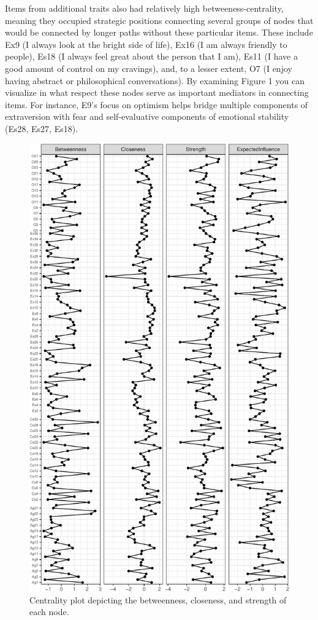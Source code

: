 \documentclass[man]{apa6}
\begin{document}
Items from additional traits also had relatively high
betweeness-centrality, meaning they occupied strategic positions
connecting several groups of nodes that would be connected by longer
paths without these particular items. These include Ex9 (I always look
at the bright side of life), Ex16 (I am always friendly to people), Es18
(I always feel great about the person that I am), Es11 (I have a good
amount of control on my cravings), and, to a lesser extent, O7 (I enjoy
having abstract or philosophical conversations). By examining Figure 1
you can visualize in what respect these nodes serve as important
mediators in connecting items. For instance, E9's focus on optimism
helps bridge multiple components of extraversion with fear and
self-evaluative components of emotional stability (Es28, Es27, Es18).

\begin{figure}
\centering
\includegraphics{Ideal_Point_Items_and_Network_Analysis_files/figure-latex/unnamed-chunk-7-1.pdf}
\caption{\label{fig:unnamed-chunk-7}Centrality plot depicting the
betweenness, closeness, and strength of each node.}
\end{figure}
\end{document}
